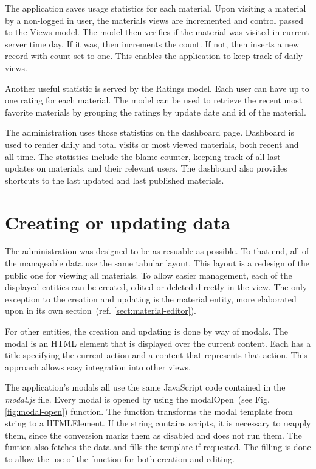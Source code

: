 \documentclass[
  digital,     %
  oneside,     %
  nosansbold,  %
  colorbold, %
  lof,         %
  lot,         %
]{fithesis4}
\newcommand{\imgref}[1]{(see Fig. \ref{fig:#1})}
\newcommand{\cref}[1]{(ref. \ref{#1})}
\begin{document}
The application saves usage statistics for each material. Upon visiting a material by a non-logged in
user, the materials views are incremented and control passed to the Views model. The model then
verifies if the material was visited in current server time day. If it was, then increments the count. If
not, then inserts a new record with count set to one. This enables the application to keep track of daily
views.

Another useful statistic is served by the Ratings model. Each user can have up to one rating for each
material. The model can be used to retrieve the recent most favorite materials by grouping the ratings
by update date and id of the material.

The administration uses those statistics on the dashboard page. Dashboard is used to render daily and
total visits or most viewed materials, both recent and all-time. The statistics include the blame
counter, keeping track of all last updates on materials, and their relevant users. The dashboard also
provides shortcuts to the last updated and last published materials.

\section{Creating or updating data}
\label{sect:data-management}

The administration was designed to be as resuable as possible. To that end, all of the manageable data
use the same tabular layout. This layout is a redesign of the public one for viewing all materials. To
allow easier management, each of the displayed entities can be created, edited or deleted directly in
the view. The only exception to the creation and updating is the material entity, more elaborated upon
in its own section~\cref{sect:material-editor}.

For other entities, the creation and updating is done by way of modals. The modal is an HTML element
that is displayed over the current content. Each has a title specifying the current action and a content
that represents that action. This approach allows easy integration into other views.

The application's modals all use the same JavaScript code contained in the \textit{modal.js} file. Every
modal is opened by using the modalOpen~\imgref{modal-open} function. The function transforms the
modal template from string to a HTMLElement. If the string contains scripts, it is necessary to reapply
them, since the conversion marks them as disabled and does not run them. The funtion also fetches
the data and fills the template if requested. The filling is done to allow the use of the function for
both creation and editing.
\end{document}
